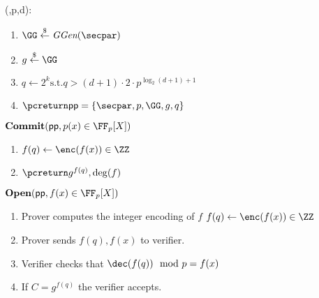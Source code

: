 \documentclass{article}
\begin{document}
\begin{mdframed}[userdefinedwidth=0.8\textwidth]
\begin{minipage}{\textwidth}
	\begin{flushleft}
	\setup(\secpar,p,d):
		\begin{enumerate}[nolistsep]
			\item $ \GG \sample \ggen(\secpar)$
			\item $ g \sample \GG$
			\item $q\gets 2^k \text{s.t.} q>(d+1) \cdot 2\cdot p^{\log_2(d+1)+1} $
			\item $\pcreturn \crs=\{\secpar,p,\GG,g,q\}$
		\end{enumerate}
		$\commit(\crs,p(x)\in \FF_p[X])$
		\begin{enumerate}[nolistsep]
			\item 	$f(q)\gets \enc(f(x)) \in \ZZ$
			\item $\pcreturn g^{f(q)},\deg(f)$
		\end{enumerate}
		$\open(\crs,f(x)\in \FF_p[X])$
		\begin{enumerate}[nolistsep]
			\item Prover computes the integer encoding of $f$ $f(q)\gets \enc(f(x)) \in \ZZ$
			\item Prover sends $f(q),f(x)$ to verifier.
			\item Verifier checks that $\dec(f(q)) \mod p=f(x)$
			\item If $C=g^{f(q)}$ the verifier accepts.
		\end{enumerate}
	\end{flushleft}
	
\end{minipage}
\end{mdframed}
\end{document}

